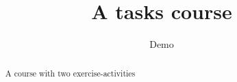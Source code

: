 \documentclass{xourse}
\title{A tasks course}
\author{Demo}
\begin{document}
\begin{abstract}
    A course with two exercise-activities
\end{abstract}
\maketitle

\end{document}
